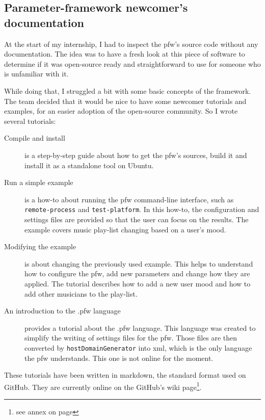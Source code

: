 \subsection{Parameter-framework newcomer's documentation}\label{sec:tutorials}

At the start of my internship, I had to inspect the \gls{pfw}'s
source code without any documentation. The idea was to have a fresh look at
this piece of software to determine if it was open-source ready and straightforward
to use for someone who is unfamiliar with it.

While doing that, I struggled a bit with some basic concepts of the framework. The
team decided that it would be nice to have some newcomer tutorials and examples,
for an easier adoption of the open-source community. So I wrote several
tutorials:
\begin{description}
    \item[Compile and install]
        is a step-by-step guide about how to get the \gls{pfw}'s sources,
        build it and install it as a standalone tool on Ubuntu.
    \item[Run a simple example]
        is a how-to about running the \gls{pfw} command-line interface,
        such as \lstinline{remote-process} and \lstinline {test-platform}.  In
        this how-to, the configuration and settings files are provided so that
        the user can focus on the results. The example covers music play-list
        changing based on a user's mood.
    \item[Modifying the example]
        is about changing the previously used example. This helps to understand
        how to configure the \gls{pfw}, add new parameters and change how they are applied.
        The tutorial describes how to add a new user mood and how to add other musicians to
        the play-list.
    \item[An introduction to the .pfw language]\label{desc:pfw-language}
        provides a tutorial about the .pfw language. This language was
        created to simplify the writing of settings files for the
        \gls{pfw}. Those files are then converted by \lstinline{hostDomainGenerator} into \gls{xml}, which is
        the only language the \gls{pfw} understands. This one is not online for the moment.
\end{description}
These tutorials have been written in \gls{markdown}, the standard format used
on \gls{GitHub}.
They are currently online on the \gls{GitHub}'s wiki page\footnote{see annex on page \pageref{chap:annex}}.

